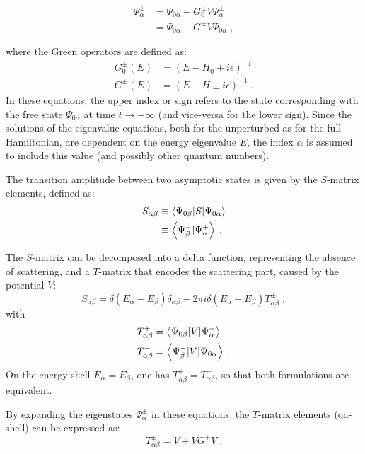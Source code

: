 \begin{align*}
  \Psi^\pm_\alpha &= \Psi_{0\alpha} + G^\pm_0 V \Psi^\pm_\alpha  \\
  & = \Psi_{0\alpha} + G^\pm V  \Psi_{0\alpha} \; ,
\end{align*}

where the Green operators are defined as:
\begin{align*}
  G^\pm_0(E) &= (E-H_0\pm i\epsilon )^{-1}  \\
  G^\pm (E) &= (E-H\pm i\epsilon )^{-1} \; .
\end{align*}
In these equations, the upper index or sign refers to the state corresponding with the free state $\Psi_{0\alpha}$ at time $t\rightarrow - \infty$ (and vice-versa for the lower sign). Since the solutions of the eigenvalue equations, both for the unperturbed as for the full Hamiltonian, are dependent on the energy eigenvalue $E$, the index $\alpha$ is assumed to include this value (and possibly other quantum numbers).

The transition amplitude between two asymptotic states is given by the $S$-matrix elements, defined as:
\begin{align}
  S_{\alpha\beta} &\equiv \left\langle \Psi_{0\beta} \vert S \vert \Psi_{0\alpha} \right\rangle \nonumber\\
  & \equiv \left\langle \Psi_\beta^- \vert \Psi_\alpha^+ \right\rangle \; .
  \label{<++>}
\end{align}

The $S$-matrix can be decomposed into a delta function, representing the absence of scattering, and a $T$-matrix that encodes the scattering part, caused by the potential $V$:
\begin{equation*}
  S_{\alpha\beta} = \delta (E_\alpha - E_\beta)\delta_{\alpha\beta} - 2\pi i \delta (E_\alpha - E_\beta) T^\pm_{\alpha\beta} \; ,
\end{equation*}
with
\begin{align*}
  T^+_{\alpha\beta} & = \left\langle \Psi_{0\beta} \vert V \vert \Psi^+_\alpha \right\rangle \\
  T^-_{\alpha\beta} & = \left\langle \Psi^-_\beta \vert V \vert \Psi_{0\alpha} \right\rangle \; .
\end{align*}
On the energy shell $E_\alpha = E_\beta$, one has $T^+_{\alpha\beta}= T^-_{\alpha\beta}$, so that both formulations are equivalent.

By expanding the eigenstates $\Psi^\pm_\alpha$ in these equations, the $T$-matrix elements (on-shell) can be expressed as:
\begin{equation*}
  T^\pm_{\alpha\beta} = V + VG^+ V \; .
\end{equation*}


